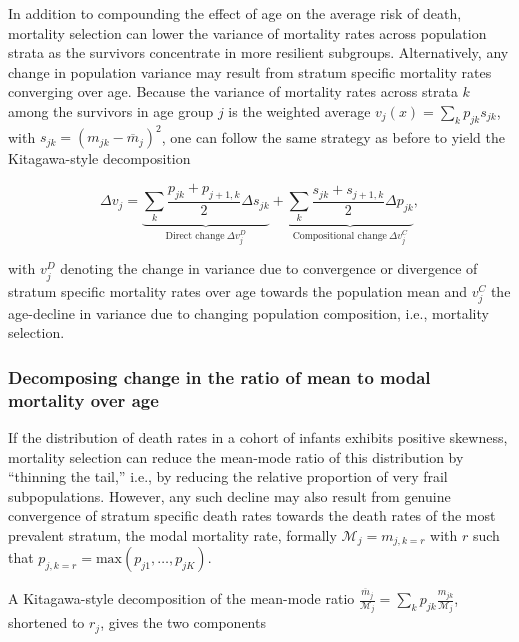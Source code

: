 \documentclass[10pt,twoside,reqno]{article}
\begin{document}
In addition to compounding the effect of age on the average risk of death, mortality selection can lower the variance of mortality rates across population strata as the survivors concentrate in more resilient subgroups. Alternatively, any change in population variance may result from stratum specific mortality rates converging over age. Because the variance of mortality rates across strata \(k\) among the survivors in age group \(j\) is the weighted average \(v_j(x)=\sum_k p_{jk}s_{jk}\), with \(s_{jk}=(m_{jk}-\overline{m}_{j})^2\), one can follow the same strategy as before to yield the Kitagawa-style decomposition

\begin{equation}
\Delta v_j =
  \underbrace{
    \sum_k \frac {p_{jk}+p_{j+1,k}} {2} \Delta s_{jk}
  }_{
    \text{Direct change}~\Delta v_j^D
  } +
  \underbrace{
    \sum_k \frac {s_{jk}+s_{j+1,k}} {2} \Delta p_{jk}
  }_{
    \text{Compositional change}~\Delta v_j^C
  },
\label{eq:decomp-var}
\end{equation}

with \(v_j^D\) denoting the change in variance due to convergence or divergence of stratum specific mortality rates over age towards the population mean and \(v_j^C\) the age-decline in variance due to changing population composition, i.e., mortality selection.

\subsubsection*{Decomposing change in the ratio of mean to modal mortality over age}\label{decomposing-change-in-the-ratio-of-mean-to-modal-mortality-over-age}

If the distribution of death rates in a cohort of infants exhibits positive skewness, mortality selection can reduce the mean-mode ratio of this distribution by ``thinning the tail,'' i.e., by reducing the relative proportion of very frail subpopulations. However, any such decline may also result from genuine convergence of stratum specific death rates towards the death rates of the most prevalent stratum, the modal mortality rate, formally \(\mathscr{M}_j = m_{j,k=r}\) with \(r\) such that \(p_{j,k=r}=\text{max}(p_{j1},\ldots,p_{jK})\).

A Kitagawa-style decomposition of the mean-mode ratio \(\frac{\overline{m}_j}{\mathscr{M}_{j}} = \sum_k p_{jk}\frac{m_{jk}}{\mathscr{M}_j}\), shortened to \(r_j\), gives the two components
\end{document}
